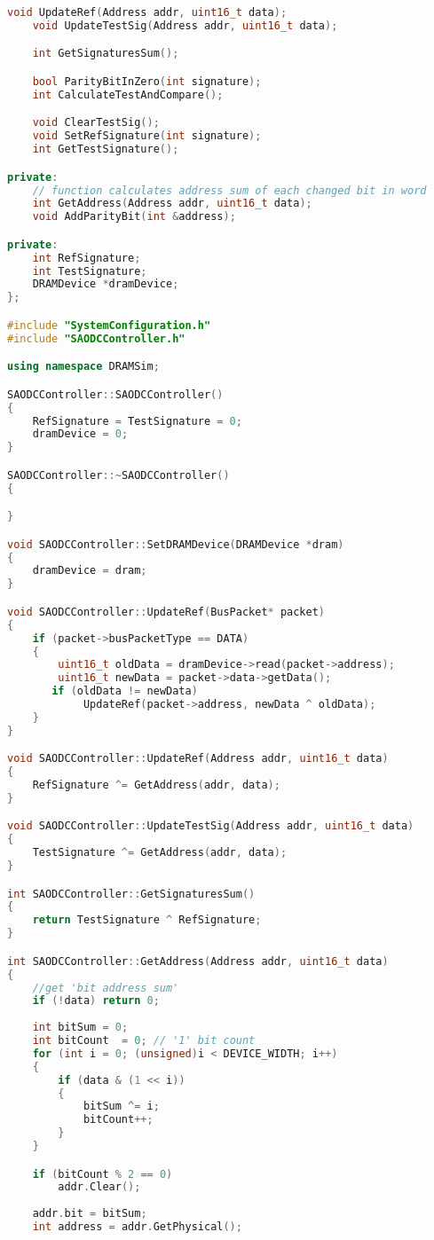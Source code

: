 \begin{lstlisting}[language=C++, style=cplusplusstyle]
	void UpdateRef(Address addr, uint16_t data);
	void UpdateTestSig(Address addr, uint16_t data);

	int GetSignaturesSum();

	bool ParityBitInZero(int signature);
    int CalculateTestAndCompare();

	void ClearTestSig();
	void SetRefSignature(int signature);
	int GetTestSignature();

private:
    // function calculates address sum of each changed bit in word
    int GetAddress(Address addr, uint16_t data);
	void AddParityBit(int &address);

private:
    int RefSignature;
    int TestSignature;
	DRAMDevice *dramDevice;
};

#include "SystemConfiguration.h"
#include "SAODCController.h"

using namespace DRAMSim;

SAODCController::SAODCController()
{
	RefSignature = TestSignature = 0;
	dramDevice = 0;
}

SAODCController::~SAODCController()
{

}

void SAODCController::SetDRAMDevice(DRAMDevice *dram)
{
	dramDevice = dram;
}

void SAODCController::UpdateRef(BusPacket* packet)
{
    if (packet->busPacketType == DATA)
    {
		uint16_t oldData = dramDevice->read(packet->address);
        uint16_t newData = packet->data->getData();
       if (oldData != newData)
            UpdateRef(packet->address, newData ^ oldData);
    }
}

void SAODCController::UpdateRef(Address addr, uint16_t data)
{
	RefSignature ^= GetAddress(addr, data);
}

void SAODCController::UpdateTestSig(Address addr, uint16_t data)
{
	TestSignature ^= GetAddress(addr, data);
}

int SAODCController::GetSignaturesSum()
{
	return TestSignature ^ RefSignature;
}

int SAODCController::GetAddress(Address addr, uint16_t data)
{
    //get 'bit address sum'
	if (!data) return 0;
    
	int bitSum = 0;
    int bitCount  = 0; // '1' bit count
    for (int i = 0; (unsigned)i < DEVICE_WIDTH; i++)
    {
        if (data & (1 << i))
        {
            bitSum ^= i;
            bitCount++;
        }
    }

    if (bitCount % 2 == 0)
		addr.Clear();
    
	addr.bit = bitSum;
	int address = addr.GetPhysical();


\end{lstlisting}
